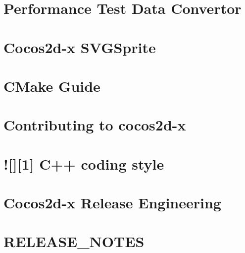 \documentclass[twoside]{book}
\newcommand{\+}{\discretionary{\mbox{\scriptsize$\hookleftarrow$}}{}{}}
\begin{document}
\chapter{Performance Test Data Convertor}
\label{md__home_pmx_git_PMX_SimuCocos_cocos2d_tools_performance-analyze_README}

\chapter{Cocos2d-\/x S\+V\+G\+Sprite}
\label{md__home_pmx_git_PMX_SimuCocos3_Classes_CocosSVGSprite-master_README}

\chapter{C\+Make Guide}
\label{md__home_pmx_git_PMX_SimuCocos3_cocos2d_cmake_README}

\chapter{Contributing to cocos2d-\/x}
\label{md__home_pmx_git_PMX_SimuCocos3_cocos2d_CONTRIBUTING}

\chapter{!\mbox{[}\mbox{]}\mbox{[}1\mbox{]} C++ coding style}
\label{md__home_pmx_git_PMX_SimuCocos3_cocos2d_docs_CODING_STYLE}

\chapter{Cocos2d-\/x Release Engineering}
\label{md__home_pmx_git_PMX_SimuCocos3_cocos2d_docs_RELEASE_ENGINEERING}

\chapter{R\+E\+L\+E\+A\+S\+E\+\_\+\+N\+O\+T\+ES}
\label{md__home_pmx_git_PMX_SimuCocos3_cocos2d_docs_RELEASE_NOTES}

\end{document}
